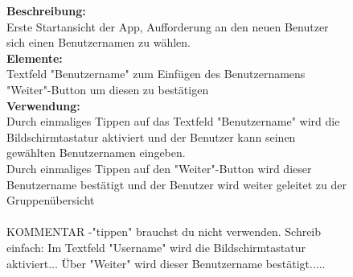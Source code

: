 \begin{figure} [H]
{	\textbf{Beschreibung:}\\
	Erste Startansicht der App, Aufforderung an den neuen Benutzer sich einen Benutzernamen zu wählen.\\
	\textbf{Elemente:}\\
	Textfeld "Benutzername" zum Einfügen des Benutzernamens\\
	"Weiter"-Button um diesen zu bestätigen\\
	\textbf{Verwendung:}\\
	Durch einmaliges Tippen auf das Textfeld "Benutzername" wird die Bildschirmtastatur aktiviert und der Benutzer kann seinen gewählten Benutzernamen eingeben.\\
	Durch einmaliges Tippen auf den "Weiter"-Button wird dieser Benutzername bestätigt und der Benutzer wird weiter geleitet zu der Gruppenübersicht\\ \\
	
	KOMMENTAR
	-"tippen" brauchst du nicht verwenden. Schreib einfach: Im Textfeld "Username" wird die Bildschirmtastatur aktiviert...
															Über "Weiter"  wird dieser Benutzername bestätigt..... 
	
}
\end{figure}

